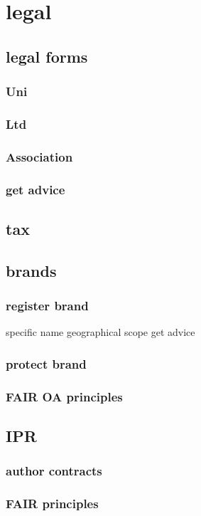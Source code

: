 \documentclass[output=guidelines,guidelines] {langscibook}
\begin{document}
\section{legal}
\subsection{legal forms}
\subsubsection{Uni}
\subsubsection{Ltd}
\subsubsection{Association}
\subsubsection{get advice}
\subsection{tax}
\subsection{brands}
\subsubsection{register brand}
                    specific name
                    geographical scope
                    get advice
\subsubsection{protect brand}
\subsubsection{FAIR OA principles}
\subsection{IPR}
\subsubsection{author contracts}
\subsubsection{FAIR principles}
\end{document}
